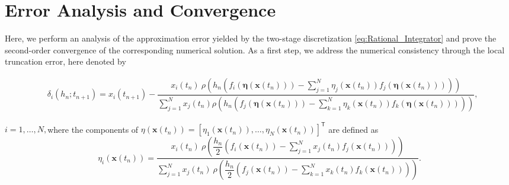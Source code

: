 \documentclass[11pt,letterpaper]{article}
\theoremstyle{remark}
\begin{document}
\section{Error Analysis and Convergence}\label{Sec:Error}
Here, we perform an analysis of the approximation error yielded by the two-stage discretization \eqref{eq:Rational_Integrator} and prove the second-order convergence of the corresponding numerical solution. As a first step, we address the numerical consistency through the local truncation error, here denoted by
\begin{adjustwidth}{-0.4in}{0in}
\begin{equation}\label{eq:Local_Error}
        \begin{split}
        &\delta_i(h_n;t_{n+1}) \!= \!x_i(t_{n+1})-\dfrac{x_i(t_n) \ \rho \! \left( \!  h_n \! \left( \! f_i(\bm{\eta}(\bm{x}(t_n))) - \displaystyle \sum_{j=1}^{N} \eta_j(\bm{x}(t_n)) f_j(\bm{\eta}(\bm{x}(t_n))) \right) \! \right)}{\displaystyle \sum_{j=1}^{N} x_j(t_n)  \rho \! \left( \! h_n \!\! \left( \! f_j(\bm{\eta}(\bm{x}(t_n))) \! - \!\! \displaystyle \sum_{k=1}^{N} \eta_k(\bm{x}(t_n)) f_k(\bm{\eta}(\bm{x}(t_n))) \! \right) \!\! \right) },
    \end{split}
\end{equation}
\end{adjustwidth}
$i=1,\dots,N,$where the components of $\eta(\bm{x}(t_n))=[\eta_1(\bm{x}(t_n)),\dots,\eta_N(\bm{x}(t_n))]^{\mathsf{T}}$ are defined as
\begin{equation}\label{eq:eta}
        \eta_i(\bm{x}(t_n))=\dfrac{x_i(t_{n}) \ \rho \! \left( \! \dfrac{h_n}{2} \! \left( \! f_i(\bm{x}(t_{n})) - \displaystyle \sum_{j=1}^{N} x_j(t_{n}) f_j(\bm{x}(t_{n})) \right) \! \right)}{\displaystyle \sum_{j=1}^{N} x_j(t_{n}) \ \rho \! \left( \! \dfrac{h_n}{2} \! \left( \! f_j(\bm{x}(t_{n})) - \displaystyle\sum_{k=1}^{N} x_k(t_{n}) f_k(\bm{x}(t_{n})) \right) \! \right) }. 
\end{equation}
\end{document}
